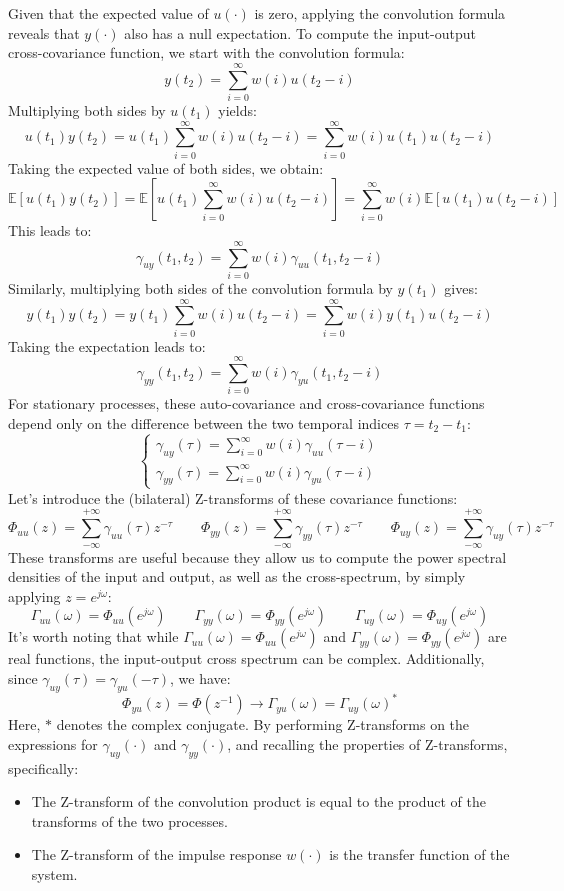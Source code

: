 Given that the expected value of $u(\cdot)$ is zero, applying the convolution formula reveals that $y(\cdot)$ also has a null expectation.
To compute the input-output cross-covariance function, we start with the convolution formula:
\[y(t_2)=\sum_{i=0}^\infty w(i)u(t_2-i)\]
Multiplying both sides by $u(t_1)$ yields:
\[u(t_1)y(t_2)=u(t_1)\sum_{i=0}^{\infty}w(i)u(t_2-i)=\sum_{i=0}^\infty w(i)u(t_1)u(t_2-i)\]
Taking the expected value of both sides, we obtain:
\[\mathbb{E}\left[u(t_1)y(t_2)\right]=\mathbb{E}\left[u(t_1)\sum_{i=0}^{\infty}w(i)u(t_2-i)\right]=\sum_{i=0}^\infty w(i) \mathbb{E}\left[u(t_1)u(t_2-i)\right]\]
This leads to:
\[\gamma_{uy}(t_1,t_2)=\sum_{i=0}^\infty w(i)\gamma_{uu}(t_1,t_2-i)\]
Similarly, multiplying both sides of the convolution formula by $y(t_1)$ gives:
\[y(t_1)y(t_2)=y(t_1)\sum_{i=0}^{\infty}w(i)u(t_2-i)=\sum_{i=0}^\infty w(i)y(t_1)u(t_2-i)\]
Taking the expectation leads to:
\[\gamma_{yy}(t_1,t_2)=\sum_{i=0}^\infty w(i)\gamma_{yu}(t_1,t_2-i)\]
For stationary processes, these auto-covariance and cross-covariance functions depend only on the difference between the two temporal indices $\tau = t_2-t_1$:
\[\begin{cases}
    \gamma_{uy}(\tau)=\sum_{i=0}^\infty w(i)\gamma_{uu}(\tau-i) \\
    \gamma_{yy}(\tau)=\sum_{i=0}^\infty w(i)\gamma_{yu}(\tau-i)
\end{cases}\]
Let's introduce the (bilateral) Z-transforms of these covariance functions:
\[\Phi_{uu}(z)=\sum_{-\infty}^{+\infty}\gamma_{uu}(\tau)z^{-\tau} \qquad \Phi_{yy}(z)=\sum_{-\infty}^{+\infty}\gamma_{yy}(\tau)z^{-\tau} \qquad \Phi_{uy}(z)=\sum_{-\infty}^{+\infty}\gamma_{uy}(\tau)z^{-\tau}\]
These transforms are useful because they allow us to compute the power spectral densities of the input and output, as well as the cross-spectrum, by simply applying $z=e^{j\omega}$:
\[\Gamma_{uu}(\omega)=\Phi_{uu}(e^{j\omega}) \qquad \Gamma_{yy}(\omega)=\Phi_{yy}(e^{j\omega}) \qquad \Gamma_{uy}(\omega)=\Phi_{uy}(e^{j\omega})\]
It's worth noting that while $\Gamma_{uu}(\omega)=\Phi_{uu}(e^{j\omega})$ and $\Gamma_{yy}(\omega)=\Phi_{yy}(e^{j\omega})$ are real functions, the input-output cross spectrum can be complex. 
Additionally, since $\gamma_{uy}(\tau)=\gamma_{yu}(-\tau)$, we have:
\[\Phi_{yu}(z)=\Phi(z^{-1})\rightarrow\Gamma_{yu}(\omega)=\Gamma_{uy}(\omega)^\ast\]
Here, $\ast$ denotes the complex conjugate.
By performing Z-transforms on the expressions for $\gamma_{uy}(\cdot)$ and $\gamma_{yy}(\cdot)$, and recalling the properties of Z-transforms, specifically:
\begin{itemize}
    \item The Z-transform of the convolution product is equal to the product of the transforms of the two processes.
    \item The Z-transform of the impulse response $w(\cdot)$ is the transfer function of the system.
\end{itemize}
